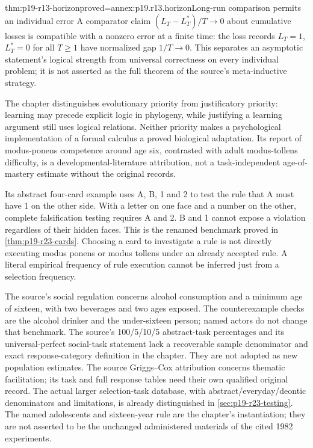 \begin{hblemma}{thm:p19-r13-horizon}{proved=annex:p19.r13.horizon}{Long-run comparison permits an individual error}
A comparator claim \((L_T-L_T^*)/T\to0\) about cumulative losses is
compatible with a nonzero error at a finite time: the loss records
\(L_T=1\), \(L_T^*=0\) for all \(T\geq1\) have normalized gap
\(1/T\to0\). This separates an asymptotic statement's logical strength
from universal correctness on every individual problem; it is not asserted
as the full theorem of the source's meta-inductive strategy.
\end{hblemma}

The chapter distinguishes evolutionary priority from justificatory priority:
learning may precede explicit logic in phylogeny, while justifying a learning
argument still uses logical relations. Neither priority makes a psychological
implementation of a formal calculus a proved biological adaptation.
Its report of modus-ponens competence around age six, contrasted with adult
modus-tollens difficulty, is a developmental-literature attribution, not a
task-independent age-of-mastery estimate without the original records.

Its abstract four-card example uses A, B, 1 and 2 to test the rule that
A must have 1 on the other side. With a letter on one face and a number
on the other, complete falsification testing requires A and 2. B and 1
cannot expose a violation regardless of their hidden faces. This is the
renamed benchmark proved in \cref{thm:p19-r23-cards}. Choosing a card
to investigate a rule is not directly executing modus ponens or modus
tollens under an already accepted rule. A literal empirical frequency
of rule execution cannot be inferred just from a selection frequency.

The source's social regulation concerns alcohol consumption and a minimum
age of sixteen, with two beverages and two ages exposed. The counterexample
checks are the alcohol drinker and the under-sixteen person; named actors
do not change that benchmark. The source's 100/5/10/5 abstract-task
percentages and its universal-perfect social-task statement lack a recoverable
sample denominator and exact response-category definition in the chapter.
They are not adopted as new population estimates. The source Griggs--Cox
attribution concerns thematic facilitation; its task and full response tables
need their own qualified original record. The actual larger selection-task
database, with abstract/everyday/deontic denominators and limitations, is
already distinguished in \cref{sec:p19-r23-testing}.
The named adolescents and sixteen-year rule are the chapter's instantiation;
they are not asserted to be the unchanged administered materials of the
cited 1982 experiments.

